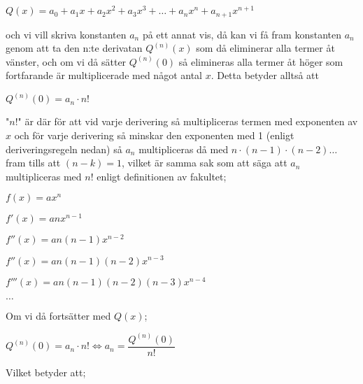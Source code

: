 \documentclass[10pt, a4paper]{amsart}
\begin{document}
\hspace{5ex}
$ Q(x) = a_0 + a_1x + a_2x^2 + a_3x^3 + \dotso + a_nx^n + a_{n+1}x^{n+1} $
\bigskip
\bigskip

och vi vill skriva konstanten $ a_n $ på ett annat vis, då kan vi få fram konstanten $ a_n $ genom att ta den n:te derivatan $ Q^{(n)}(x) $ som då eliminerar alla termer åt vänster,
och om vi då sätter $ Q^{(n)}(0) $ så elimineras alla termer åt höger som fortfarande är multiplicerade med något antal $ x $. Detta betyder alltså att
\vspace{24pt plus 4pt minus 4pt}

\hspace{5ex}
$ Q^{(n)}(0) = a_n \cdot n! $
\vspace{24pt plus 4pt minus 4pt}

"$ n! $" är där för att vid varje derivering så multipliceras termen med exponenten av $ x $ och för varje derivering så minskar den exponenten med 1 (enligt deriveringsregeln nedan) 
så $ a_n $ multipliceras då med $ n \cdot (n-1) \cdot (n-2) \dotso $ fram tills att $ (n - k) = 1 $,
vilket är samma sak som att säga att $ a_n $ multipliceras med $ n! $ enligt definitionen av fakultet;
\vspace{24pt plus 4pt minus 4pt}

\hspace{5ex}
$ f(x) = ax^n $

\hspace{5ex}
$ f'(x) = anx^{n-1} $

\hspace{5ex}
$ f''(x) = an(n-1)x^{n-2} $

\hspace{5ex}
$ f''(x) = an(n-1)(n-2)x^{n-3} $

\hspace{5ex}
$ f'''(x) = an(n-1)(n-2)(n-3)x^{n-4} $

\hspace{5ex}
$ \dotso $
\vspace{24pt plus 4pt minus 4pt}

Om vi då fortsätter med $ Q(x) $;
\vspace{24pt plus 4pt minus 4pt}

\hspace{5ex}
$ Q^{(n)}(0) = a_n \cdot n! \iff a_n = \dfrac{Q^{(n)}(0)}{n!} $ 
\vspace{24pt plus 4pt minus 4pt}

Vilket betyder att;
\vspace{24pt plus 4pt minus 4pt}
\end{document}
